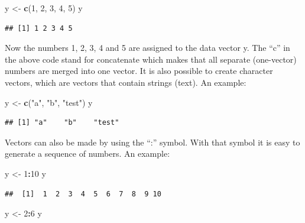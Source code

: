 \documentclass[]{book}
\newenvironment{Shaded}{\begin{snugshade}}{\end{snugshade}}
\newcommand{\KeywordTok}[1]{\textcolor[rgb]{0.13,0.29,0.53}{\textbf{#1}}}
\newcommand{\DecValTok}[1]{\textcolor[rgb]{0.00,0.00,0.81}{#1}}
\newcommand{\StringTok}[1]{\textcolor[rgb]{0.31,0.60,0.02}{#1}}
\newcommand{\OperatorTok}[1]{\textcolor[rgb]{0.81,0.36,0.00}{\textbf{#1}}}
\newcommand{\NormalTok}[1]{#1}
\theoremstyle{definition}
\theoremstyle{definition}
\theoremstyle{definition}
\theoremstyle{remark}
\begin{document}
\begin{Shaded}
\begin{Highlighting}[]
\NormalTok{y <-}\StringTok{ }\KeywordTok{c}\NormalTok{(}\DecValTok{1}\NormalTok{, }\DecValTok{2}\NormalTok{, }\DecValTok{3}\NormalTok{, }\DecValTok{4}\NormalTok{, }\DecValTok{5}\NormalTok{)}
\NormalTok{y}
\end{Highlighting}
\end{Shaded}

\begin{verbatim}
## [1] 1 2 3 4 5
\end{verbatim}

Now the numbers 1, 2, 3, 4 and 5 are assigned to the data vector y. The
``c'' in the above code stand for concatenate which makes that all
separate (one-vector) numbers are merged into one vector. It is also
possible to create character vectors, which are vectors that contain
strings (text). An example:

\begin{Shaded}
\begin{Highlighting}[]
\NormalTok{y <-}\StringTok{ }\KeywordTok{c}\NormalTok{(}\StringTok{"a"}\NormalTok{, }\StringTok{"b"}\NormalTok{, }\StringTok{"test"}\NormalTok{)}
\NormalTok{y}
\end{Highlighting}
\end{Shaded}

\begin{verbatim}
## [1] "a"    "b"    "test"
\end{verbatim}

Vectors can also be made by using the ``:'' symbol. With that symbol it
is easy to generate a sequence of numbers. An example:

\begin{Shaded}
\begin{Highlighting}[]
\NormalTok{y <-}\StringTok{ }\DecValTok{1}\OperatorTok{:}\DecValTok{10}
\NormalTok{y}
\end{Highlighting}
\end{Shaded}

\begin{verbatim}
##  [1]  1  2  3  4  5  6  7  8  9 10
\end{verbatim}

\begin{Shaded}
\begin{Highlighting}[]
\NormalTok{y <-}\StringTok{ }\DecValTok{2}\OperatorTok{:}\DecValTok{6}
\NormalTok{y}
\end{Highlighting}
\end{Shaded}
\end{document}
